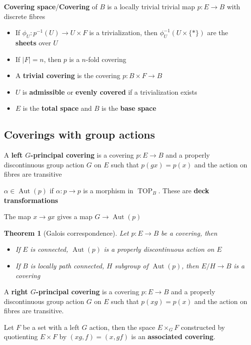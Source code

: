 \documentclass[12pt]{article}
\newtheorem*{thm*}{Theorem}
\DeclareMathOperator{\Aut}{Aut}
\DeclareMathOperator{\TOP}{TOP}
\begin{document}
\textbf{Covering space}/\textbf{Covering} of $B$ is a locally trivial trivial map $p:E\to B$ with discrete fibres
\begin{itemize}
    \item If $\phi_U:p^{-1}(U)\to U\times F$ is a trivialization, then $\phi_U^{-1}\left(U\times\{*\}\right)$ are the \textbf{sheets} over $U$
    \item If $|F|=n$, then $p$ is a $n$-fold covering
    \item A \textbf{trivial covering} is the covering $p:B\times F\to B$
    \item $U$ is \textbf{admissible} or \textbf{evenly covered} if a trivialization exists
    \item $E$ is the \textbf{total space} and $B$ is the \textbf{base space}
\end{itemize}

\subsection{Coverings with group actions}

A \textbf{left $G$-principal covering} is a covering $p:E\to B$ and a properly discontinuous group action $G$ on $E$ such that $p(gx)=p(x)$ and the action on fibres are transitive

$\alpha\in\Aut(p)$ if $\alpha:p\to p$ is a morphism in $\TOP_B$. These are \textbf{deck transformations}

The map $x\to gx$ gives a map $G\to\Aut(p)$

\begin{thm*}[Galois correspondence]
    Let $p:E\to B$ be a covering, then
    \begin{itemize}
        \item If $E$ is connected, $\Aut(p)$ is a properly discontinuous action on $E$
        \item If $B$ is locally path connected, $H$ subgroup of $\Aut(p)$, then $E/H\to B$ is a covering
    \end{itemize}
\end{thm*}

A \textbf{right $G$-principal covering} is a covering $p:E\to B$ and a properly discontinuous group action $G$ on $E$ such that $p(xg)=p(x)$ and the action on fibres are transitive.

Let $F$ be a set with a left $G$ action, then the space $E\times_GF$ constructed by quotienting $E\times F$ by $\left(xg,f\right)=\left(x,gf\right)$ is an \textbf{associated covering}.
\end{document}
